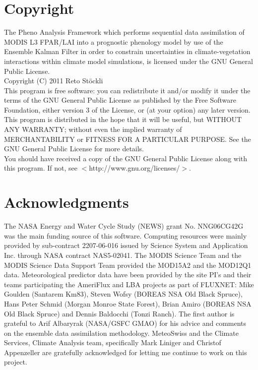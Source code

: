 \documentclass[a4paper,12pt]{article}
\begin{document}
\section{Copyright}
The Pheno Analysis Framework which performs sequential data assimilation of MODIS L3 FPAR/LAI into a prognostic phenology model by use of the Ensemble Kalman Filter in order to constrain uncertainties in climate-vegetation interactions within climate model simulations, is licensed under the GNU General Public License.\\[0.5cm]
Copyright (C) 2011  Reto St\"ockli\\[0.5cm]
This program is free software: you can redistribute it and/or modify it under the terms of the GNU General Public License as published by the Free Software Foundation, either version 3 of the License, or (at your option) any later version.\\
This program is distributed in the hope that it will be useful, but WITHOUT ANY WARRANTY; without even the implied warranty of MERCHANTABILITY or FITNESS FOR A PARTICULAR PURPOSE.  See the GNU General Public License for more details.\\
You should have received a copy of the GNU General Public License along with this program.  If not, see $<$http://www.gnu.org/licenses/$>$.

\section{Acknowledgments}
The NASA Energy and Water Cycle Study (NEWS) grant No. NNG06CG42G was the main funding source of this software. Computing resources were mainly provided by sub-contract 2207-06-016 issued by Science System and Application Inc. through NASA contract NAS5-02041. The MODIS Science Team and the MODIS Science Data Support Team provided the MOD15A2 and the MOD12Q1 data. Meteorological predictor data have been provided by the site PI's and their teams participating the AmeriFlux and LBA projects as part of FLUXNET: Mike Goulden (Santarem Km83), Steven Wofsy (BOREAS NSA Old Black Spruce), Hans Peter Schmid (Morgan Monroe State Forest), Brian Amiro (BOREAS NSA Old Black Spruce) and Dennis Baldocchi (Tonzi Ranch). The first author is grateful to Arif Albaryrak (NASA/GSFC GMAO) for his advice and comments on the ensemble data assimilation methodology. MeteoSwiss and the Climate Services, Climate Analysis team, specifically Mark Liniger and Christof Appenzeller are gratefully acknowledged for letting me continue to work on this project.



\end{document}
